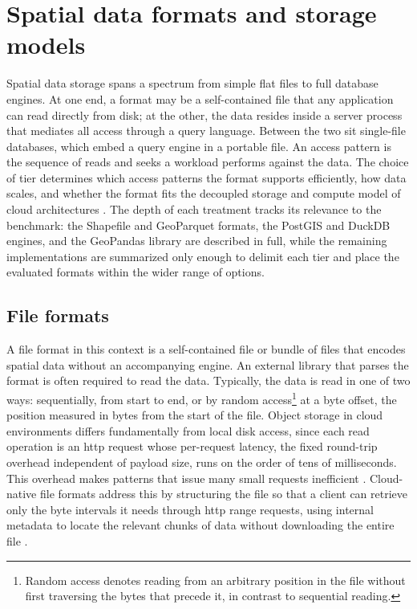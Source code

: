 \section{Spatial data formats and storage models}
\label{background:spatial-data-formats-and-storage-models}

Spatial data storage spans a spectrum from simple flat files to full database engines. At one end, a format may be a self-contained file that any application can read directly from disk; at the other, the data resides inside a server process that mediates all access through a query language. Between the two sit single-file databases, which embed a query engine in a portable file. An access pattern is the sequence of reads and seeks a workload performs against the data. The choice of tier determines which access patterns the format supports efficiently, how data scales, and whether the format fits the decoupled storage and compute model of cloud architectures \parencite{cngfoundation2024_cloud_optimized_geospatial_formats_guide}. The depth of each treatment tracks its relevance to the benchmark: the Shapefile and GeoParquet formats, the PostGIS and DuckDB engines, and the GeoPandas library are described in full, while the remaining implementations are summarized only enough to delimit each tier and place the evaluated formats within the wider range of options.

\subsection{File formats}
\label{background:spatial-data-formats-and-storage-models:file-formats}
A file format in this context is a self-contained file or bundle of files that encodes spatial data without an accompanying engine. An external library that parses the format is often required to read the data. Typically, the data is read in one of two ways: sequentially, from start to end, or by random access\footnote{Random access denotes reading from an arbitrary position in the file without first traversing the bytes that precede it, in contrast to sequential reading.} at a byte offset, the position measured in bytes from the start of the file. Object storage in cloud environments differs fundamentally from local disk access, since each read operation is an \acrshort{http} request whose per-request latency, the fixed round-trip overhead independent of payload size, runs on the order of tens of milliseconds. This overhead makes patterns that issue many small requests inefficient \parencite{esri2024_cloud_imagery_storage}. Cloud-native file formats address this by structuring the file so that a client can retrieve only the byte intervals it needs through \acrshort{http} range requests, using internal metadata to locate the relevant chunks of data without downloading the entire file \parencite{ogc2023_cog_standard_21026}.

